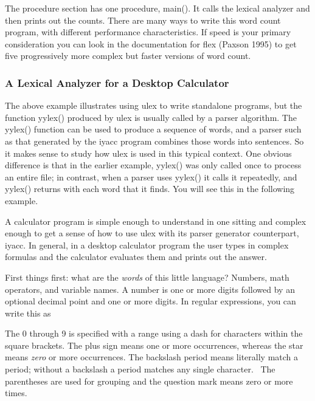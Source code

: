 The procedure section has one procedure, \textsf{main()}. It calls the
lexical analyzer and then prints out the counts. There are many ways to
write this word count program, with different performance
characteristics. If speed is your primary consideration you can look in
the documentation for \textsf{flex} (Paxson 1995) to get five
progressively more complex but faster versions of word count.

\subsubsection{A Lexical Analyzer for a Desktop Calculator}

The above example illustrates using \textsf{ulex} to write standalone
programs, but the function \textsf{yylex()} produced by \textsf{ulex}
is usually called by a parser algorithm. The \textsf{yylex()} function
can be used to produce a sequence of words, and a parser such as that
generated by the \textsf{iyacc} program combines those words into
sentences. So it makes sense to study how \textsf{ulex} is used in this
typical context. One obvious difference is that in the earlier example,
\textsf{yylex()} was only called once to process an entire file; in
contrast, when a parser uses \textsf{yylex()} it calls it repeatedly,
and \textsf{yylex()} returns with each word that it finds. You will see
this in the following example.

A calculator program is simple enough to understand in one sitting and
complex enough to get a sense of how to use \textsf{ulex} with its
parser generator counterpart, \textsf{iyacc}. In general, in a desktop
calculator program the user types in complex formulas and the
calculator evaluates them and prints out the answer.

First things first: what are the \textit{words} of this little language?
Numbers, math operators, and variable names. A number is one or more
digits followed by an optional decimal point and one or more digits. In
regular expressions, you can write this as


The 0 through 9 is specified with a range using a dash for characters
within the square brackets. The plus sign means one or more
occurrences, whereas the star means \textit{zero} or more occurrences.
The backslash period means literally match a period; without a
backslash a period matches any single character. \ The parentheses are
used for grouping and the question mark means zero or more times.


